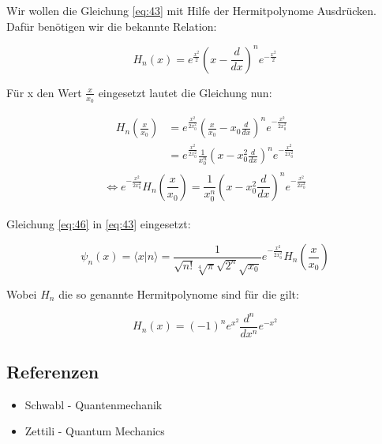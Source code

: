 Wir wollen die Gleichung \eqref{eq:43} mit Hilfe der Hermitpolynome Ausdrücken. Dafür benötigen wir die bekannte Relation:

\begin{equation}
  \label{eq:44}
  H_n(x) = e^{\frac{x^2}{2}} \left( x-\frac{d}{dx}\right)^n e^{-\frac{x^2}{2}}
\end{equation}

Für x den Wert \(\frac{x}{x_0}\) eingesetzt lautet die Gleichung nun:

\begin{align}
  H_n\left(\frac{x}{x_0} \right) &= e^{\frac{x^2}{2x_0^2}} \left( \frac{x}{x_0}- x_0\frac{d}{dx}\right)^n e^{-\frac{x^2}{2x_0^2}} \\
 &= e^{\frac{x^2}{2x_0^2}} \frac{1}{x_0^n} \left( x - x_0^2\frac{d}{dx}\right)^n e^{-\frac{x^2}{2x_0^2}} \\ \label{eq:45}
\end{align}
\begin{equation}
  \label{eq:46}
  \Leftrightarrow e^{-\frac{x^2}{2x_0^2}}H_n\left(\frac{x}{x_0} \right) = \frac{1}{x_0^n} \left( x - x_0^2\frac{d}{dx}\right)^n e^{-\frac{x^2}{2x_0^2}} 
\end{equation}
\\
Gleichung \eqref{eq:46} in \eqref{eq:43} eingesetzt:

\begin{equation}
  \label{eq:47}
   \boxed{\psi_n(x) =  \langle x |n\rangle = \frac{1}{\sqrt{n!}\sqrt[4]{\pi}\sqrt{2^n}\sqrt{x_0}}  e^{-\frac{x^2}{2x_0^2}}H_n\left(\frac{x}{x_0} \right)   }
\end{equation}

Wobei \(H_n\) die so genannte Hermitpolynome sind für die gilt:

\begin{equation}
  \label{eq:48}
  H_n(x) = (-1)^ne^{x^2}\frac{d^n}{dx^n}e^{-x^2}
\end{equation}



\subsection*{Referenzen}

\begin{itemize}
\item Schwabl - Quantenmechanik
\item Zettili - Quantum Mechanics
\end{itemize}



